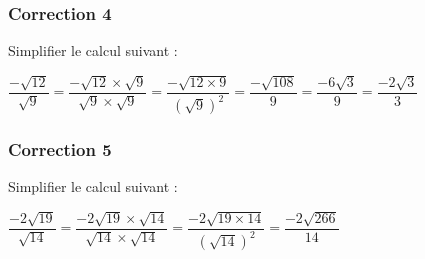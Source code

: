 \documentclass[15pt, mathserif]{beamer}
\begin{document}
\begin{frame}
\vspace{-10mm}
	\frametitle{Correction 4}
Simplifier le calcul suivant : 
 
 $\dfrac{-\sqrt{12}}{\sqrt{9}} = \dfrac{-\sqrt{12} \times \sqrt{9}}{\sqrt{9} \times \sqrt{9}}= \dfrac{-\sqrt{12\times 9}}{(\sqrt{9})^2} = \dfrac{-\sqrt{108}}{9} = \dfrac{-6\sqrt{3}}{9}=\dfrac{-2\sqrt{3}}{3}$ 
 
 \end{frame}


\begin{frame}
\vspace{-10mm}
	\frametitle{Correction 5}
Simplifier le calcul suivant : 
 
 $\dfrac{-2\sqrt{19}}{\sqrt{14}} = \dfrac{-2\sqrt{19} \times \sqrt{14}}{\sqrt{14} \times \sqrt{14}}= \dfrac{-2\sqrt{19\times 14}}{(\sqrt{14})^2} = \dfrac{-2\sqrt{266}}{14}$ 
 
 \end{frame}
\end{document}
